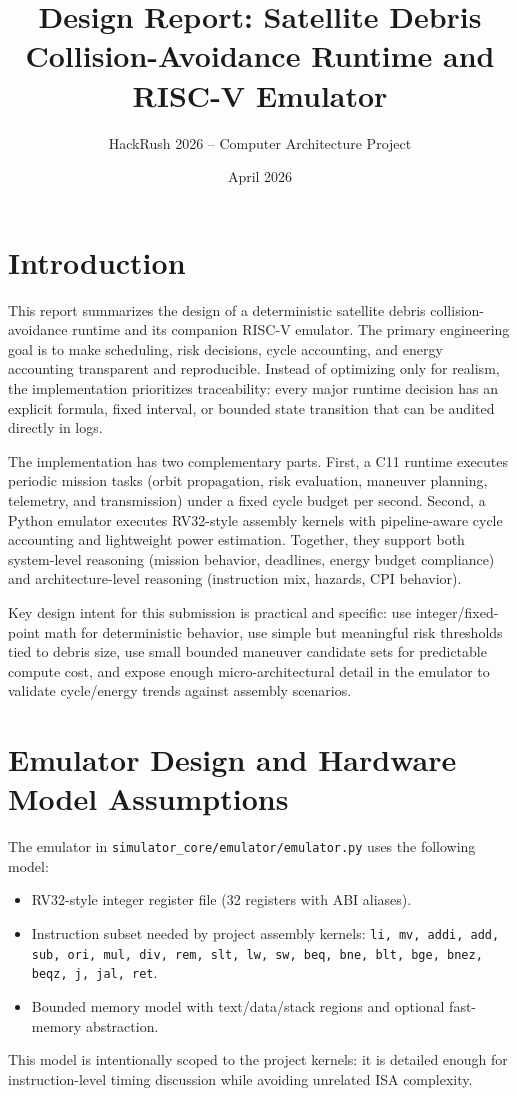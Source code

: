 \documentclass[11pt,a4paper]{article}
\title{Design Report: Satellite Debris Collision-Avoidance Runtime and RISC-V Emulator}
\author{HackRush 2026 -- Computer Architecture Project}
\date{April 2026}
\begin{document}
\maketitle

\section{Introduction}
This report summarizes the design of a deterministic satellite debris collision-avoidance runtime and its companion RISC-V emulator. The primary engineering goal is to make scheduling, risk decisions, cycle accounting, and energy accounting transparent and reproducible. Instead of optimizing only for realism, the implementation prioritizes traceability: every major runtime decision has an explicit formula, fixed interval, or bounded state transition that can be audited directly in logs.

The implementation has two complementary parts. First, a C11 runtime executes periodic mission tasks (orbit propagation, risk evaluation, maneuver planning, telemetry, and transmission) under a fixed cycle budget per second. Second, a Python emulator executes RV32-style assembly kernels with pipeline-aware cycle accounting and lightweight power estimation. Together, they support both system-level reasoning (mission behavior, deadlines, energy budget compliance) and architecture-level reasoning (instruction mix, hazards, CPI behavior).

Key design intent for this submission is practical and specific: use integer/fixed-point math for deterministic behavior, use simple but meaningful risk thresholds tied to debris size, use small bounded maneuver candidate sets for predictable compute cost, and expose enough micro-architectural detail in the emulator to validate cycle/energy trends against assembly scenarios.

\section{Emulator Design and Hardware Model Assumptions}
The emulator in \texttt{simulator\_core/emulator/emulator.py} uses the following model:
\begin{itemize}[leftmargin=1.5em]
    \item RV32-style integer register file (32 registers with ABI aliases).
    \item Instruction subset needed by project assembly kernels:
    \texttt{li, mv, addi, add, sub, ori, mul, div, rem, slt, lw, sw, beq, bne, blt, bge, bnez, beqz, j, jal, ret}.
    \item Bounded memory model with text/data/stack regions and optional fast-memory abstraction.
\end{itemize}
This model is intentionally scoped to the project kernels: it is detailed enough for instruction-level timing discussion while avoiding unrelated ISA complexity.
\end{document}
